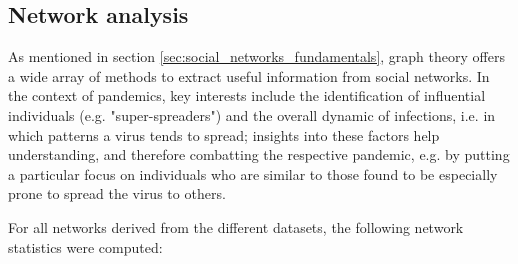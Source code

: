 \subsection{Network analysis}
\label{sec:social_networks_analysis}

As mentioned in section \ref{sec:social_networks_fundamentals}, graph theory offers a wide array of methods to extract useful information from social networks. In the context of pandemics, key interests include the identification of influential individuals (e.g. "super-spreaders") and the overall dynamic of infections, i.e. in which patterns a virus tends to spread; insights into these factors help understanding, and therefore combatting the respective pandemic, e.g. by putting a particular focus on individuals who are similar to those found to be especially prone to spread the virus to others.

For all networks derived from the different datasets, the following network statistics were computed:

